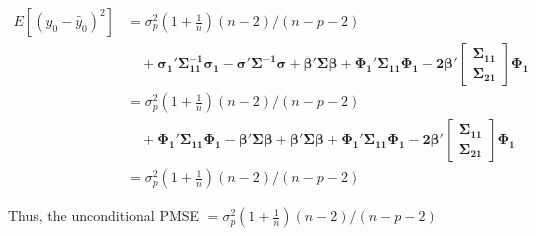 \documentclass[11pt]{article}
\begin{document}
$$\begin{aligned}
E[(y_0-\tilde{y_0})^2] 
&= \sigma_p^2(1+\frac{1}{n})(n-2)/(n-p-2)\\
&\quad+\boldsymbol{\sigma_1'\Sigma_{11}^{-1}\sigma_1-\sigma'\Sigma^{-1}\sigma}+\boldsymbol{\beta'\Sigma\beta+\Phi_1'\Sigma_{11}\Phi_1-2\beta'}
\begin{bmatrix}\boldsymbol{\Sigma_{11}}\\
\boldsymbol{\Sigma_{21}}\end{bmatrix}\boldsymbol{\Phi_1}\\
&= \sigma_p^2(1+\frac{1}{n})(n-2)/(n-p-2)\\
&\quad+\boldsymbol{\Phi_1'\Sigma_{11}\Phi_1-\beta'\Sigma\beta}+\boldsymbol{\beta'\Sigma\beta+\Phi_1'\Sigma_{11}\Phi_1-2\beta'}
\begin{bmatrix}\boldsymbol{\Sigma_{11}}\\
\boldsymbol{\Sigma_{21}}\end{bmatrix}\boldsymbol{\Phi_1}\\
&= \sigma_p^2(1+\frac{1}{n})(n-2)/(n-p-2)
\end{aligned}$$

Thus, the unconditional PMSE $=\sigma_p^2(1+\frac{1}{n})(n-2)/(n-p-2)$
\end{document}
